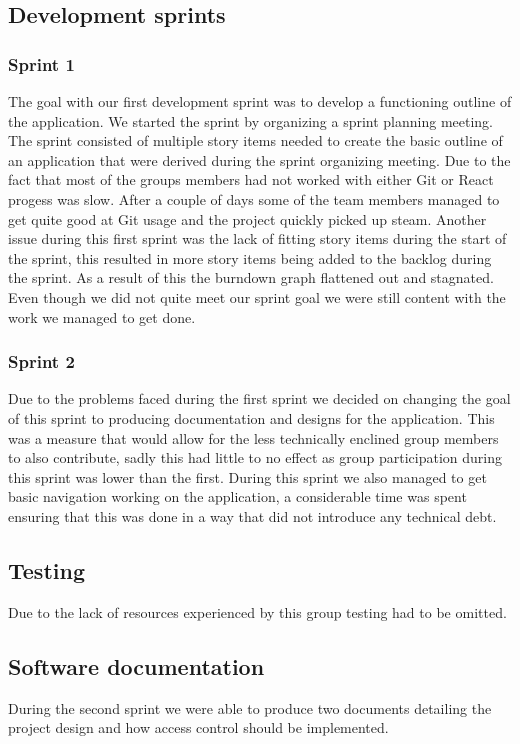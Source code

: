 \documentclass[12pt]{article}
\begin{document}
\subsection{Development sprints}

\subsubsection{Sprint 1}
The goal with our first development sprint was to develop a functioning outline of the application. We started the sprint by organizing a sprint
planning meeting. The sprint consisted of multiple story items needed to create the basic outline of an application that were derived during the sprint organizing meeting.
Due to the fact that most of the groups members had not worked with either Git or React progess was slow. After a couple of days some of the
team members managed to get quite good at Git usage and the project quickly picked up steam. Another issue during this first sprint
was the lack of fitting story items during the start of the sprint, this resulted in more story items being added to the backlog during the sprint.
As a result of this the burndown graph flattened out and stagnated.
Even though we did not quite meet our sprint goal we were still content with the work we managed to get done.

\subsubsection{Sprint 2}
Due to the problems faced during the first sprint we decided on changing the goal of this sprint to producing documentation and designs for the application.
This was a measure that would allow for the less technically enclined group members to also contribute, sadly this had little to no effect as group participation
during this sprint was lower than the first. During this sprint we also managed to get basic navigation working on the application, a considerable time
was spent ensuring that this was done in a way that did not introduce any technical debt.

\subsection{Testing}
Due to the lack of resources experienced by this group testing had to be omitted.

\subsection{Software documentation}
During the second sprint we were able to produce two documents detailing the project design and
how access control should be implemented.
\end{document}
